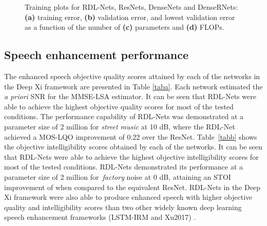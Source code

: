 \documentclass[letterpaper]{article} \usepackage{aaai20}  \usepackage{times}  \usepackage{helvet} \usepackage{courier}  \usepackage[hyphens]{url}  \usepackage{graphicx} \urlstyle{rm} \def\UrlFont{\rm}  \usepackage{graphicx}  \frenchspacing  \setlength{\pdfpagewidth}{8.5in}  \setlength{\pdfpageheight}{11in}
\begin{document}
\begin{figure}[t]
\caption{Training plots for RDL-Nets, ResNets, DenseNets and DenseRNets: \textbf{(a)} training error, \textbf{(b)} validation error, and lowest validation error as a function of the number of \textbf{(c)} parameters and \textbf{(d)} FLOPs.}
	\label{fig:Curves}
\end{figure}


\subsection{Speech enhancement performance}
The enhanced speech objective quality scores attained by each of the networks in the Deep Xi framework are presented in Table \ref{taba}. Each network estimated the \textit{a priori} SNR for the MMSE-LSA estimator. It can be seen that RDL-Nets were able to achieve the highest objective quality scores for most of the tested conditions. The performance capability of RDL-Nets was demonstrated at a parameter size of 2 million for \textit{street music} at 10 dB, where the RDL-Net achieved a MOS-LQO improvement of 0.22 over the ResNet. Table~\ref{tabb} shows the objective intelligibility scores obtained by each of the networks. It can be seen that RDL-Nets were able to achieve the highest objective intelligibility scores for most of the tested conditions. RDL-Nets demonstrated its performance at a parameter size of 2 million for~\textit{factory} noise at 0 dB, attaining an STOI improvement of  when compared to the equivalent ResNet. RDL-Nets in the Deep Xi framework were also able to produce enhanced speech with higher objective quality and intelligibility scores than two other widely known deep learning speech enhancement frameworks (LSTM-IRM and Xu2017) \cite{xu2017multi,chen2017long}.
\end{document}
